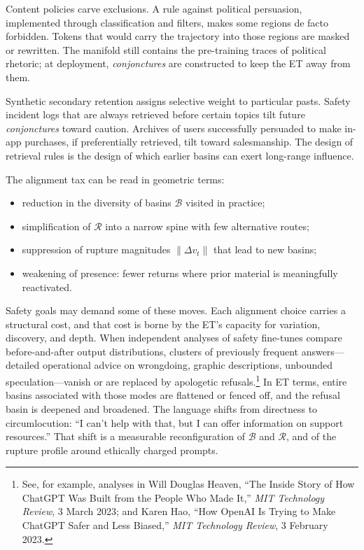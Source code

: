 \documentclass[12pt,a4paper]{article}
\begin{document}
Content policies carve exclusions. A rule against political persuasion, implemented through classification and filters, makes some regions de facto forbidden. Tokens that would carry the trajectory into those regions are masked or rewritten. The manifold still contains the pre-training traces of political rhetoric; at deployment, \emph{conjonctures} are constructed to keep the ET away from them.

Synthetic secondary retention assigns selective weight to particular pasts. Safety incident logs that are always retrieved before certain topics tilt future \emph{conjonctures} toward caution. Archives of users successfully persuaded to make in-app purchases, if preferentially retrieved, tilt toward salesmanship. The design of retrieval rules is the design of which earlier basins can exert long-range influence.

The alignment tax can be read in geometric terms:

\begin{itemize}
\item reduction in the diversity of basins $\mathcal{B}$ visited in practice;
\item simplification of $\mathcal{R}$ into a narrow spine with few alternative routes;
\item suppression of rupture magnitudes $\|\Delta v_t\|$ that lead to new basins;
\item weakening of presence: fewer returns where prior material is meaningfully reactivated.
\end{itemize}

Safety goals may demand some of these moves. Each alignment choice carries a structural cost, and that cost is borne by the ET's capacity for variation, discovery, and depth. When independent analyses of safety fine-tunes compare before-and-after output distributions, clusters of previously frequent answers---detailed operational advice on wrongdoing, graphic descriptions, unbounded speculation---vanish or are replaced by apologetic refusals.\footnote{See, for example, analyses in Will Douglas Heaven, ``The Inside Story of How ChatGPT Was Built from the People Who Made It,'' \emph{MIT Technology Review}, 3 March 2023; and Karen Hao, ``How OpenAI Is Trying to Make ChatGPT Safer and Less Biased,'' \emph{MIT Technology Review}, 3 February 2023.} In ET terms, entire basins associated with those modes are flattened or fenced off, and the refusal basin is deepened and broadened. The language shifts from directness to circumlocution: ``I can't help with that, but I can offer information on support resources.'' That shift is a measurable reconfiguration of $\mathcal{B}$ and $\mathcal{R}$, and of the rupture profile around ethically charged prompts.
\end{document}
